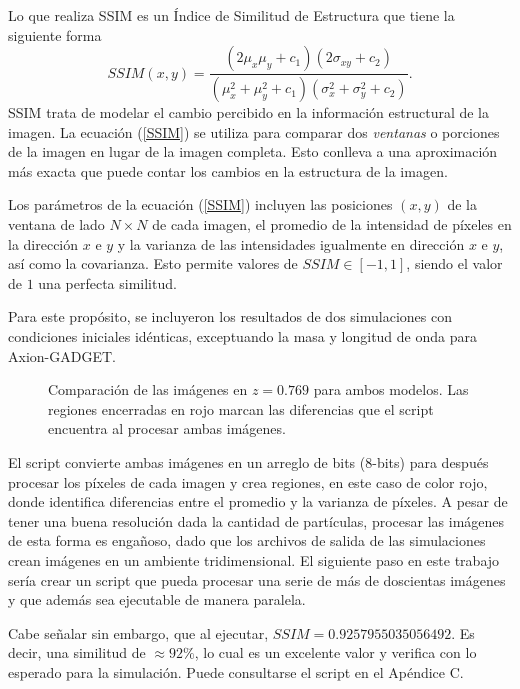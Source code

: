 \documentclass[a4paper,openright,12pt]{book}
\begin{document}
Lo que realiza \textsf{SSIM} es un Índice de Similitud de Estructura \cite{4.6} que tiene la siguiente forma
\begin{equation}
SSIM(x,y) = \frac{(2\mu_{x}\mu_{y}+c_{1})(2\sigma_{xy}+c_{2})}{(\mu_{x}^{2}+\mu_{y}^{2}+c_{1})(\sigma_{x}^{2}+\sigma_{y}^{2}+c_{2})}.\label{SSIM}
\end{equation}
\textsf{SSIM} trata de modelar el cambio percibido en la informaci\'on estructural de la imagen. La ecuación (\ref{SSIM}) se utiliza para comparar dos \textit{ventanas} o porciones de la imagen en lugar de la imagen completa. Esto conlleva a una aproximaci\'on más exacta que puede contar los cambios en la estructura de la imagen.

Los parámetros de la ecuación (\ref{SSIM}) incluyen las posiciones $(x,y)$ de la ventana de lado $N\times N$ de cada imagen, el promedio de la intensidad de píxeles en la dirección $x$ e $y$ y la varianza de las intensidades igualmente en dirección $x$ e $y$, así como la covarianza. Esto permite valores de $SSIM \in [-1,1]$, siendo el valor de $1$ una perfecta similitud. 

Para este propósito, se incluyeron los resultados de dos simulaciones con condiciones iniciales idénticas, exceptuando la masa y longitud de onda para Axion-GADGET.

\begin{figure}
 \centering
{}
\caption{\footnotesize{Comparación de las imágenes en $z=0.769$ para ambos modelos. Las regiones encerradas en rojo marcan las diferencias que el script encuentra al procesar ambas imágenes.}}\label{fig 4.5}
\end{figure}

El script convierte ambas imágenes en un arreglo de bits ($8$-bits) para después procesar los píxeles de cada imagen y crea regiones, en este caso de color rojo, donde identifica diferencias entre el promedio y la varianza de píxeles. A pesar de tener una buena resoluci\'on dada la cantidad de partículas, procesar las imágenes de esta forma es engañoso, dado que los archivos de salida de las simulaciones crean imágenes en un ambiente tridimensional. El siguiente paso en este trabajo sería crear un script que pueda procesar una serie de más de doscientas imágenes y que además sea ejecutable de manera paralela.

Cabe señalar sin embargo, que al ejecutar,  $SSIM = 0.9257955035056492$. Es decir, una similitud de $\approx 92\%$, lo cual es un excelente valor y verifica con lo esperado para la simulación. Puede consultarse el script en el Apéndice C.
\end{document}
